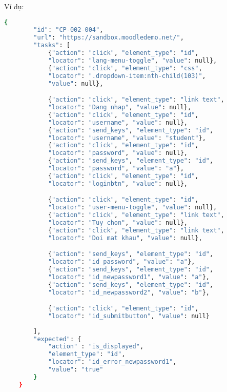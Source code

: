 Ví dụ:
\begin{lstlisting}[language=bash, caption={Ví dụ testcase CP-002-004 ở level 2}, breaklines=true]
    {
        "id": "CP-002-004",
        "url": "https://sandbox.moodledemo.net/",
        "tasks": [
            {"action": "click", "element_type": "id", 
            "locator": "lang-menu-toggle", "value": null},
            {"action": "click", "element_type": "css", 
            "locator": ".dropdown-item:nth-child(103)", 
            "value": null},

            {"action": "click", "element_type": "link text", 
            "locator": "Dang nhap", "value": null},
            {"action": "click", "element_type": "id", 
            "locator": "username", "value": null},
            {"action": "send_keys", "element_type": "id", 
            "locator": "username", "value": "student"},
            {"action": "click", "element_type": "id", 
            "locator": "password", "value": null},
            {"action": "send_keys", "element_type": "id", 
            "locator": "password", "value": "a"},
            {"action": "click", "element_type": "id", 
            "locator": "loginbtn", "value": null},

            {"action": "click", "element_type": "id", 
            "locator": "user-menu-toggle", "value": null},
            {"action": "click", "element_type": "link text", 
            "locator": "Tuy chon", "value": null},
            {"action": "click", "element_type": "link text", 
            "locator": "Doi mat khau", "value": null},

            {"action": "send_keys", "element_type": "id", 
            "locator": "id_password", "value": "a"},
            {"action": "send_keys", "element_type": "id", 
            "locator": "id_newpassword1", "value": "a"},
            {"action": "send_keys", "element_type": "id", 
            "locator": "id_newpassword2", "value": "b"},

            {"action": "click", "element_type": "id", 
            "locator": "id_submitbutton", "value": null}
            
        ],
        "expected": {
            "action" : "is_displayed",
            "element_type": "id",
            "locator": "id_error_newpassword1",
            "value": "true"
        }
    }
\end{lstlisting}
